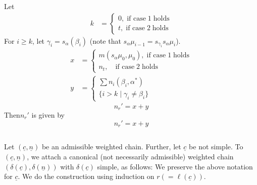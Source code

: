 Let
\begin{align*}
k &=
\begin{cases}
0,\; \text{if case}\; 1 \; \text{holds}\\
t, \; \text{if case}\; 2 \;\text{holds}
 \end{cases}
\end{align*}
For $i\geq k$, let $\gamma_{i}=s_{\alpha}(\beta_{i})$ (note that $s_{\alpha}\mu_{i-1}= s_{\gamma_{i}}s_{\alpha}\mu_{i}$).
\begin{align*}
x&=
\begin{cases}
m(s_{\alpha}\mu_{0}, \mu_{0}), \; \text{if case} \; 1\; \text{holds}\\
n_{t}, \quad \text{if case}\; 2 \; \text{holds}
\end{cases}\\
y&=
\begin{cases}
\sum n_{i}(\beta_{i}, \alpha^{*})\\
\{i > k \;|\; \gamma_{i} \neq \beta_{i}\}
\end{cases}
\end{align*}
$$
n_{r}'= x+y
$$
Then\pageoriginale $n_{r}'$ is given by
$$
n_{r}' = x+y
$$

\subsection{}\label{chap9-subsec-3.8}

Let $(\underline{c}, \underline{n})$ be an admissible weighted chain. Further, let $\underline{c}$ be not simple. To $(\underline{c}, \underline{n})$, we attach a canonical (not necessarily admissible) weighted chain $(\delta(\underline{c}), \delta(\underline{n}))$ with $\delta(\underline{c})$ simple, as follows: We preserve the above notation for $\underline{c}$. We do the construction using induction on $r(=\ell(\underline{c}))$. 

